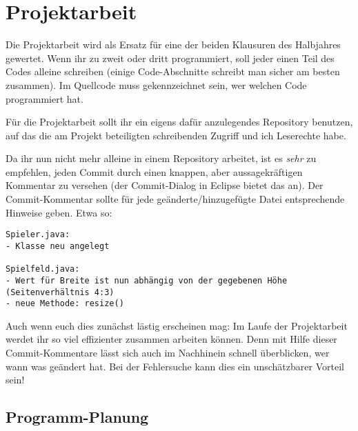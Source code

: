 \chapter{Projektarbeit}
\renewcommand{\chaptertitle}{Projektarbeit}

\lehead[]{\sf\hspace*{-2.00cm}\textcolor{white}{\colorbox{lightblue}{\makebox[1.60cm][r]{\thechapter}}}\hspace{0.17cm}\textcolor{lightblue}{\chaptertitle}}
\rohead[]{\textcolor{lightblue}{\chaptertitle}\sf\hspace*{0.17cm}\textcolor{white}{\colorbox{lightblue}{\makebox[1.60cm][l]{\thechapter}}}\hspace{-2.00cm}}
\rehead[]{\textcolor{lightblue}{AvHG, Inf, My}}
\lohead[]{\textcolor{lightblue}{AvHG, Inf, My}}

\lstset{style=myJava}

Die Projektarbeit wird als Ersatz für eine der beiden Klausuren des Halbjahres
gewertet. Wenn ihr zu zweit oder dritt programmiert, soll jeder einen Teil des
Codes alleine schreiben (einige Code-Abschnitte schreibt man sicher am besten
zusammen). Im Quellcode muss gekennzeichnet sein, wer welchen Code programmiert
hat.

Für die Projektarbeit sollt ihr ein eigens dafür anzulegendes Repository
benutzen, auf das die am Projekt beteiligten schreibenden Zugriff und ich
Leserechte habe.

Da ihr nun nicht mehr alleine in einem Repository arbeitet, ist es \emph{sehr}
zu empfehlen, jeden Commit durch einen knappen, aber aussagekräftigen Kommentar
zu versehen (der Commit-Dialog in Eclipse bietet das an). Der Commit-Kommentar
sollte für jede geänderte/hinzugefügte Datei entsprechende Hinweise geben. Etwa
so:

\begin{lstlisting}
Spieler.java:
- Klasse neu angelegt

Spielfeld.java: 
- Wert für Breite ist nun abhängig von der gegebenen Höhe (Seitenverhältnis 4:3)
- neue Methode: resize()
\end{lstlisting}

Auch wenn euch dies zunächst lästig erscheinen mag: Im Laufe der Projektarbeit
werdet ihr so viel effizienter zusammen arbeiten können. Denn mit Hilfe dieser
Commit-Kommentare lässt sich auch im Nachhinein schnell überblicken, wer wann
was geändert hat. Bei der Fehlersuche kann dies ein unschätzbarer Vorteil sein!

\section{Programm-Planung}

